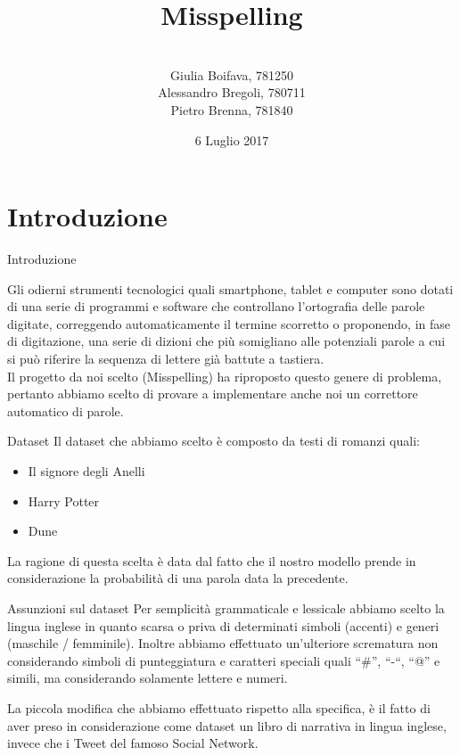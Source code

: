 \documentclass{beamer}
\title{Misspelling}
\author[Boifava, Bregoli, Brenna]{ \\ Giulia Boifava, 781250 \\ Alessandro Bregoli, 780711 \\ Pietro Brenna, 781840}
\date{6 Luglio 2017}
\begin{document}
\begin{frame}
  \titlepage
\end{frame}

\section{Introduzione}

\begin{frame}{Introduzione}


    Gli odierni strumenti tecnologici quali smartphone, tablet e computer sono dotati di una serie di programmi e software che controllano
    l’ortografia delle parole digitate, correggendo automaticamente il termine scorretto o proponendo, in fase di digitazione, una serie di
    dizioni che più somigliano alle potenziali parole a cui si può riferire la sequenza di lettere già battute a tastiera.\\
    Il progetto da noi scelto (Misspelling) ha riproposto questo genere di problema, pertanto abbiamo scelto di provare a implementare 
    anche noi un correttore automatico di parole.

\end{frame}
\begin{frame}{Dataset}
Il dataset che abbiamo scelto è composto da testi di romanzi quali:
\begin{itemize}
 \item Il signore degli Anelli
 \item Harry Potter
 \item Dune
\end{itemize}
La ragione di questa scelta è data dal fatto che il nostro modello prende in considerazione
la probabilità di una parola data la precedente.
\end{frame}

\begin{frame}{Assunzioni sul dataset}
Per semplicità grammaticale e lessicale abbiamo scelto la lingua inglese in quanto scarsa o priva di determinati simboli (accenti) e generi (maschile / 
femminile).
Inoltre abbiamo effettuato un’ulteriore scrematura non considerando simboli di punteggiatura e caratteri speciali quali “\#”, “-“, “@” e simili, ma 
considerando solamente lettere e numeri.

La piccola modifica che abbiamo effettuato rispetto alla specifica, è il fatto di aver preso in considerazione come dataset un libro di narrativa in 
lingua inglese, invece che i Tweet del famoso Social Network.
\end{frame}
\end{document}
